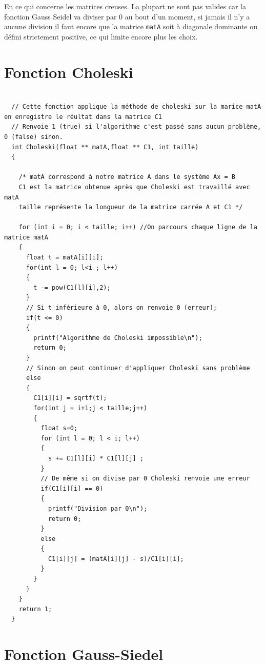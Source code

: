 \documentclass[12pt]{article}
\begin{document}
En ce qui concerne les matrices creuses. La plupart ne sont pas valides car la fonction Gauss Seidel va diviser par 0 au bout d'un moment, si jamais il n'y a aucune division il faut encore que la matrice \texttt{matA} soit à diagonale dominante ou défini strictement positive, ce qui limite encore plus les choix.



\newpage
\appendix
\section{Fonction Choleski}
\label{Func_choleski}

\begin{lstlisting}

  // Cette fonction applique la méthode de choleski sur la marice matA en enregistre le réultat dans la matrice C1
  // Renvoie 1 (true) si l'algorithme c'est passé sans aucun problème, 0 (false) sinon.
  int Choleski(float ** matA,float ** C1, int taille)
  {
    
    /* matA correspond à notre matrice A dans le système Ax = B
    C1 est la matrice obtenue après que Choleski est travaillé avec matA
    taille représente la longueur de la matrice carrée A et C1 */
    
    for (int i = 0; i < taille; i++) //On parcours chaque ligne de la matrice matA
    {
      float t = matA[i][i];
      for(int l = 0; l<i ; l++)
      {
        t -= pow(C1[l][i],2);
      }
      // Si t inférieure à 0, alors on renvoie 0 (erreur);
      if(t <= 0)
      {
        printf("Algorithme de Choleski impossible\n");
        return 0;
      }
      // Sinon on peut continuer d'appliquer Choleski sans problème
      else
      {
        C1[i][i] = sqrtf(t);
        for(int j = i+1;j < taille;j++)
        {
          float s=0;
          for (int l = 0; l < i; l++)
          {
            s += C1[l][i] * C1[l][j] ;     
          }
          // De même si on divise par 0 Choleski renvoie une erreur
          if(C1[i][i] == 0)
          {
            printf("Division par 0\n");
            return 0;
          }
          else
          {
            C1[i][j] = (matA[i][j] - s)/C1[i][i];
          }
        }
      }
    }
    return 1;
  }

\end{lstlisting}

\vspace{0.5cm}

\section{Fonction Gauss-Siedel}
\label{Func_GS}
\end{document}
